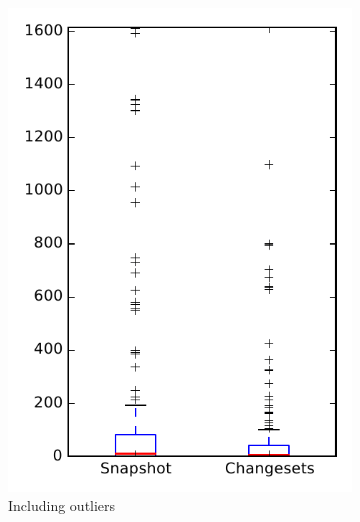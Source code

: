 
\begin{figure}
    \centering
    \begin{subfigure}{.4\textwidth}
        \centering
        \includegraphics[height=0.4\textheight]{figures/flt/rq1_pig}
        \caption{Including outliers}\label{fig:flt:rq1:pig_outlier}
    \end{subfigure}%
    \begin{subfigure}{.4\textwidth}
        \centering

\end{subfigure}
\end{figure}
